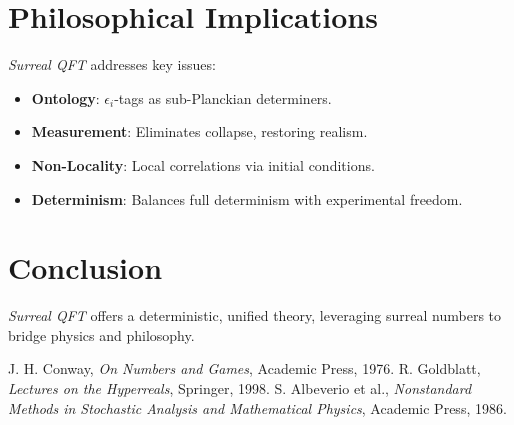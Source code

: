 \documentclass{article}
\begin{document}
\section{Philosophical Implications}
\textit{Surreal QFT} addresses key issues:
\begin{itemize}
    \item \textbf{Ontology}: \(\epsilon_i\)-tags as sub-Planckian determiners.
    \item \textbf{Measurement}: Eliminates collapse, restoring realism.
    \item \textbf{Non-Locality}: Local correlations via initial conditions.
    \item \textbf{Determinism}: Balances full determinism with experimental freedom.
\end{itemize}

\section{Conclusion}
\textit{Surreal QFT} offers a deterministic, unified theory, leveraging surreal numbers to bridge physics and philosophy.

\begin{thebibliography}{9}
 J. H. Conway, \emph{On Numbers and Games}, Academic Press, 1976.
 R. Goldblatt, \emph{Lectures on the Hyperreals}, Springer, 1998.
 S. Albeverio et al., \emph{Nonstandard Methods in Stochastic Analysis and Mathematical Physics}, Academic Press, 1986.
\end{thebibliography}
\end{document}
